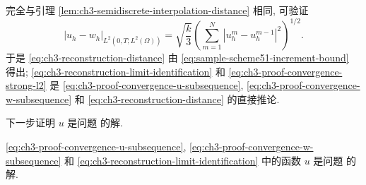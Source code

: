 \begin{Proof}
完全与引理 \ref{lem:ch3-semidiscrete-interpolation-distance} 相同, 可验证
\begin{equation}
|u_h-w_h|_{L^2(0,T;L^2(\Omega))}
=\sqrt{\frac k3}
\left(\sum_{m=1}^N|u_h^m-u_h^{m-1}|^2\right)^{1/2}.
\label{eq:ch3-reconstruction-distance-identity}
\end{equation}
于是 \eqref{eq:ch3-reconstruction-distance} 由 \eqref{eq:sample-scheme51-increment-bound} 得出; \eqref{eq:ch3-reconstruction-limit-identification} 和 \eqref{eq:ch3-proof-convergence-strong-l2} 是 \eqref{eq:ch3-proof-convergence-u-subsequence}, \eqref{eq:ch3-proof-convergence-w-subsequence} 和 \eqref{eq:ch3-reconstruction-distance} 的直接推论.
\end{Proof}

\hypertarget{chapter-03-page-258}{}
下一步证明 $u$ 是问题  的解.

\begin{Lemma}
\label{lem:ch3-convergence-limit-solves-problem}
\eqref{eq:ch3-proof-convergence-u-subsequence}, \eqref{eq:ch3-proof-convergence-w-subsequence} 和 \eqref{eq:ch3-reconstruction-limit-identification} 中的函数 $u$ 是问题  的解.
\end{Lemma}

